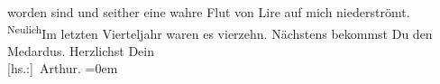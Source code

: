 \begin{ledgroupsized}[t]{13cm}
               worden sind und seither eine wahre Flut von Lire auf mich niederströmt. \substVorne{}\textsuperscript{Neulich}{\allowbreak}\substDazwischen{}Im letzten Vierteljahr\substHinten{} waren es vierzehn.\pend
           \pstart
           Nächstens bekommst Du den Medardus.\pend
           \pstart
           Herzlichst Dein{\\[\baselineskip]}\spacefill\mbox{{[}hs.:{]} Arthur.}\pend
           \leftskip=0em{}
         
         \endnumbering{}\end{ledgroupsized}  \newcommand{\dateiname}{L01963}\newcommand{\titel}{Arthur Schnitzler an Hermann Bahr, 8. 10. 1910}\newcommand{\editorInnen}{ Kurt Ifkovits,  Martin Anton Müller}
      